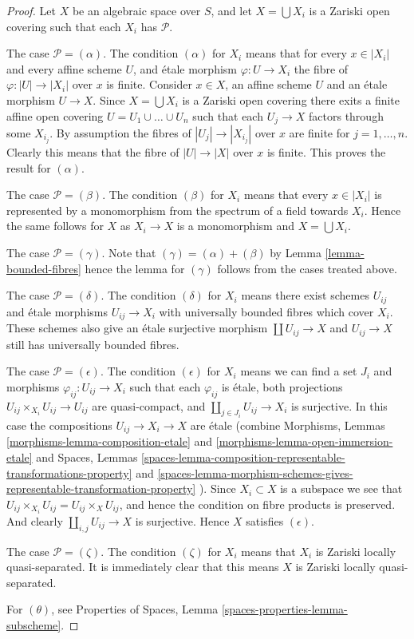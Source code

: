 \documentclass{stacks-project}
\theoremstyle{plain}
\theoremstyle{definition}
\theoremstyle{remark}
\numberwithin{equation}{subsection}
\begin{document}
\begin{proof}
Let $X$ be an algebraic space over $S$, and let $X = \bigcup X_i$ is a
Zariski open covering such that each $X_i$ has $\mathcal{P}$.

\medskip\noindent
The case $\mathcal{P} = (\alpha)$. The condition $(\alpha)$ for $X_i$
means that for every $x \in |X_i|$ and every affine scheme $U$, and
\'etale morphism $\varphi : U \to X_i$ the fibre of $\varphi : |U| \to |X_i|$
over $x$ is finite. Consider $x \in X$, an affine scheme $U$ and
an \'etale morphism $U \to X$. Since $X = \bigcup X_i$ is a
Zariski open covering there exits a finite affine open covering
$U = U_1 \cup \ldots \cup U_n$ such that each $U_j \to X$ factors through
some $X_{i_j}$. By assumption the fibres of $|U_j | \to |X_{i_j}|$
over $x$ are finite for $j = 1, \ldots, n$. Clearly this means that
the fibre of $|U| \to |X|$ over $x$ is finite.
This proves the result for $(\alpha)$.

\medskip\noindent
The case $\mathcal{P} = (\beta)$. The condition $(\beta)$ for $X_i$ means
that every $x \in |X_i|$ is represented by a monomorphism from the
spectrum of a field towards $X_i$. Hence the same follows for $X$
as $X_i \to X$ is a monomorphism and $X = \bigcup X_i$.

\medskip\noindent
The case $\mathcal{P} = (\gamma)$.
Note that $(\gamma) = (\alpha) + (\beta)$ by
Lemma \ref{lemma-bounded-fibres}
hence the lemma for $(\gamma)$ follows from the cases treated above.

\medskip\noindent
The case $\mathcal{P} = (\delta)$. The condition $(\delta)$ for $X_i$ means
there exist schemes $U_{ij}$ and \'etale morphisms $U_{ij} \to X_i$ with
universally bounded fibres which cover $X_i$. These schemes also give an
\'etale surjective morphism $\coprod U_{ij} \to X$ and $U_{ij} \to X$
still has universally bounded fibres.

\medskip\noindent
The case $\mathcal{P} = (\epsilon)$. The condition $(\epsilon)$ for $X_i$ means
we can find a set $J_i$ and morphisms
$\varphi_{ij} : U_{ij} \to X_i$ such that each $\varphi_{ij}$
is \'etale, both projections $U_{ij} \times_{X_i} U_{ij} \to U_{ij}$
are quasi-compact, and $\coprod_{j \in J_i} U_{ij} \to X_i$ is surjective.
In this case the compositions $U_{ij} \to X_i \to X$ are \'etale
(combine
Morphisms, Lemmas
\ref{morphisms-lemma-composition-etale} and
\ref{morphisms-lemma-open-immersion-etale}
and
Spaces, Lemmas
\ref{spaces-lemma-composition-representable-transformations-property} and
\ref{spaces-lemma-morphism-schemes-gives-representable-transformation-property}
).
Since $X_i \subset X$ is a subspace we see that
$U_{ij} \times_{X_i} U_{ij} = U_{ij} \times_X U_{ij}$, and hence the
condition on fibre products is preserved. And clearly
$\coprod_{i, j} U_{ij} \to X$ is surjective. Hence $X$
satisfies $(\epsilon)$.

\medskip\noindent
The case $\mathcal{P} = (\zeta)$. The condition $(\zeta)$ for $X_i$
means that $X_i$ is Zariski locally quasi-separated. It is immediately
clear that this means $X$ is Zariski locally quasi-separated.

\medskip\noindent
For $(\theta)$, see
Properties of Spaces,
Lemma \ref{spaces-properties-lemma-subscheme}.
\end{proof}
\end{document}
